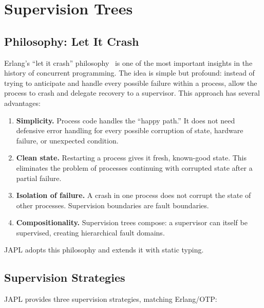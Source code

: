 \documentclass[11pt,a4paper]{article}
\begin{document}
\section{Supervision Trees}\label{sec:supervision}

\subsection{Philosophy: Let It Crash}

Erlang's ``let it crash'' philosophy~\citep{armstrong2003making} is one of the most important insights in the history of concurrent programming. The idea is simple but profound: instead of trying to anticipate and handle every possible failure within a process, allow the process to crash and delegate recovery to a supervisor. This approach has several advantages:

\begin{enumerate}
\item \textbf{Simplicity.} Process code handles the ``happy path.'' It does not need defensive error handling for every possible corruption of state, hardware failure, or unexpected condition.

\item \textbf{Clean state.} Restarting a process gives it fresh, known-good state. This eliminates the problem of processes continuing with corrupted state after a partial failure.

\item \textbf{Isolation of failure.} A crash in one process does not corrupt the state of other processes. Supervision boundaries are fault boundaries.

\item \textbf{Compositionality.} Supervision trees compose: a supervisor can itself be supervised, creating hierarchical fault domains.
\end{enumerate}

JAPL adopts this philosophy and extends it with static typing.

\subsection{Supervision Strategies}

JAPL provides three supervision strategies, matching Erlang/OTP:
\end{document}
